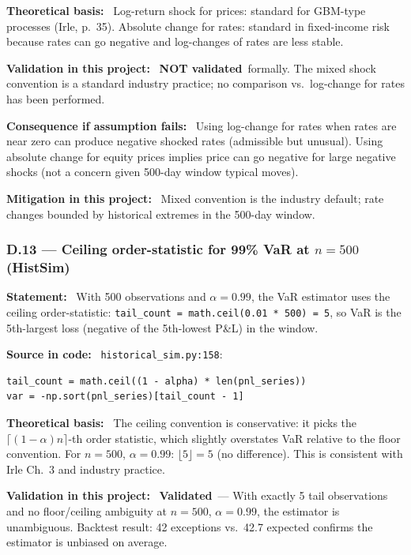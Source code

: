 \documentclass[11pt,a4paper]{article}
\newcommand{\asmfield}[1]{\medskip\noindent\textbf{#1:}\ }
\newcommand{\code}[1]{\texttt{#1}}
\newcommand{\validated}{\textbf{Validated}}
\newcommand{\notvalidated}{\textbf{NOT validated}}
\begin{document}
\asmfield{Theoretical basis}
Log-return shock for prices: standard for GBM-type processes (Irle, p.~35).
Absolute change for rates: standard in fixed-income risk because rates can
go negative and log-changes of rates are less stable.

\asmfield{Validation in this project}
\notvalidated\ formally. The mixed shock convention is a standard industry
practice; no comparison vs.\ log-change for rates has been performed.

\asmfield{Consequence if assumption fails}
Using log-change for rates when rates are near zero can produce
negative shocked rates (admissible but unusual). Using absolute change
for equity prices implies price can go negative for large negative shocks
(not a concern given 500-day window typical moves).

\asmfield{Mitigation in this project}
Mixed convention is the industry default; rate changes bounded by historical
extremes in the 500-day window.

\subsubsection{D.13 --- Ceiling order-statistic for 99\% VaR at $n=500$ (HistSim)}\label{asm:D13}

\asmfield{Statement}
With 500 observations and $\alpha = 0.99$, the VaR estimator uses the
ceiling order-statistic: \code{tail\_count = math.ceil(0.01 * 500) = 5},
so VaR is the 5th-largest loss (negative of the 5th-lowest P\&L) in the
window.

\asmfield{Source in code}
\code{historical\_sim.py:158}:
\begin{lstlisting}
tail_count = math.ceil((1 - alpha) * len(pnl_series))
var = -np.sort(pnl_series)[tail_count - 1]
\end{lstlisting}

\asmfield{Theoretical basis}
The ceiling convention is conservative: it picks the $\lceil(1-\alpha)n\rceil$-th
order statistic, which slightly overstates VaR relative to the floor
convention. For $n=500$, $\alpha=0.99$: $\lfloor 5 \rfloor = 5$
(no difference). This is consistent with Irle Ch.~3 and industry practice.

\asmfield{Validation in this project}
\validated\ --- With exactly 5 tail observations and no floor/ceiling
ambiguity at $n=500$, $\alpha=0.99$, the estimator is unambiguous.
Backtest result: 42 exceptions vs.\ 42.7 expected confirms the estimator
is unbiased on average.
\end{document}
